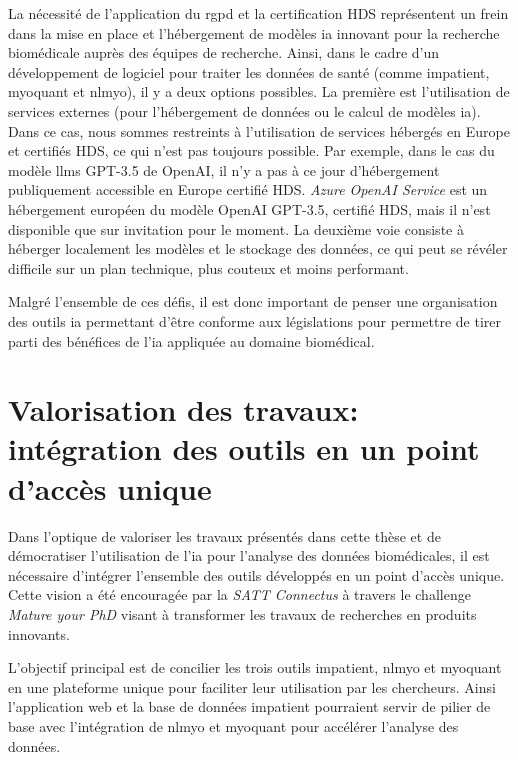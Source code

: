 La nécessité de l'application du \gls{rgpd} et la certification HDS représentent un frein dans la mise en place et l'hébergement de modèles \gls{ia} innovant pour la recherche biomédicale auprès des équipes de recherche. Ainsi, dans le cadre d'un développement de logiciel pour traiter les données de santé (comme \gls{impatient}, \gls{myoquant} et \gls{nlmyo}), il y a deux options possibles. La première est l'utilisation de services externes (pour l'hébergement de données ou le calcul de modèles \gls{ia}). Dans ce cas, nous sommes restreints à l'utilisation de services hébergés en Europe et certifiés HDS, ce qui n'est pas toujours possible. Par exemple, dans le cas du modèle \gls{llms} GPT-3.5 de OpenAI, il n'y a pas à ce jour d'hébergement publiquement accessible en Europe certifié HDS. \textit{Azure OpenAI Service} est un hébergement européen du modèle OpenAI GPT-3.5, certifié HDS, mais il n'est disponible que sur invitation pour le moment. La deuxième voie consiste à héberger localement les modèles et le stockage des données, ce qui peut se révéler difficile sur un plan technique, plus couteux et moins performant.

Malgré l'ensemble de ces défis, il est donc important de penser une organisation des outils \gls{ia} permettant d'être conforme aux législations pour permettre de tirer parti des bénéfices de l'\gls{ia} appliquée au domaine biomédical.

\section{Valorisation des travaux: intégration des outils en un point d'accès unique}
Dans l'optique de valoriser les travaux présentés dans cette thèse et de démocratiser l'utilisation de l’\gls{ia} pour l'analyse des données biomédicales, il est nécessaire d'intégrer l'ensemble des outils développés en un point d'accès unique. Cette vision a été encouragée par la \textit{SATT Connectus} à travers le challenge \textit{Mature your PhD} visant à transformer les travaux de recherches en produits innovants.

L'objectif principal est de concilier les trois outils \gls{impatient}, \gls{nlmyo} et \gls{myoquant} en une plateforme unique pour faciliter leur utilisation par les chercheurs. Ainsi l'application web et la base de données \gls{impatient} pourraient servir de pilier de base avec l'intégration de \gls{nlmyo} et \gls{myoquant} pour accélérer l'analyse des données.

